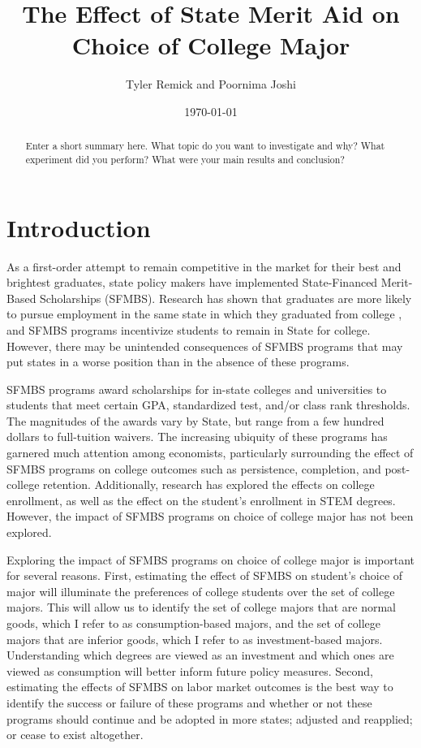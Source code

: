 \documentclass[a4paper]{article}
\title{The Effect of State Merit Aid on Choice of College Major}
\author{Tyler Remick and Poornima Joshi}
\date{\today}
\begin{document}
\maketitle

\begin{abstract}
Enter a short summary here. What topic do you want to investigate and why? What experiment did you perform? What were your main results and conclusion?
\end{abstract}

\section{Introduction}
\label{sec:introduction}

As a first-order attempt to remain competitive in the market for their best and brightest graduates, state policy makers have implemented State-Financed Merit-Based Scholarships (SFMBS). Research has shown that graduates are more likely to pursue employment in the same state in which they graduated from college  \cite{nano3}, and SFMBS programs incentivize students to remain in State for college. However, there may be unintended consequences of SFMBS programs that may put states in a worse position than in the absence of these programs. 

SFMBS programs award scholarships for in-state colleges and universities to students that meet certain GPA, standardized test, and/or class rank thresholds. The magnitudes of the awards vary by State, but range from a few hundred dollars to full-tuition waivers. The increasing ubiquity of these programs has garnered much attention among economists, particularly surrounding the effect of SFMBS programs on college outcomes such as persistence, completion, and post-college retention. Additionally, research has explored the effects on college enrollment, as well as the effect on the student’s enrollment in STEM degrees. However, the impact of SFMBS programs on choice of college major has not been explored. 

Exploring the impact of SFMBS programs on choice of college major is important for several reasons. First, estimating the effect of SFMBS on student’s choice of major will illuminate the preferences of college students over the set of college majors. This will allow us to identify the set of college majors that are normal goods, which I refer to as consumption-based majors, and the set of college majors that are inferior goods, which I refer to as investment-based majors. Understanding which degrees are viewed as an investment and which ones are viewed as consumption will better inform future policy measures. Second, estimating the effects of SFMBS on labor market outcomes is the best way to identify the success or failure of these programs and whether or not these programs should continue and be adopted in more states; adjusted and reapplied; or cease to exist altogether.
\end{document}

